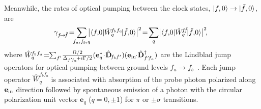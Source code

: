 \documentclass[aps,pra,twocolumn]{revtex4-1} %
\begin{document}
\begin{appendix}
Meanwhile, the rates of optical pumping between the clock states, $\lvert{f,0}\rangle \rightarrow \lvert{\tilde{f},0}\rangle$, are
	\begin{equation}\label{Eq::gammaff}
		\!\!\gamma_{f \!\rightarrow\! \tilde{f} }\! =\!\!\!\sum_{f_a,f_b,q}\!\!\!\big| \bra{f,\!0} \hat{W}_q^{\!f_bf_a} \!\ket{\tilde{f},\!0} \big|^2\!=\!\sum_{q}\!\big| \bra{f,\!0} \hat{W}_q^{\!f\!\tilde{f}} \!\ket{\tilde{f},\!0} \big|^2\!,
	\end{equation}
where $ \hat{W}_q^{\!f_bf_a} \!=\!\! \sum_{f'}\!\frac{\Omega/2}{\Delta_{f'\!f_a}\!+i\Gamma/2}(\mathbf{e}_q^*\!\cdot\!\hat{\mathbf{D}}_{\!f_bf'} )(\mathbf{e}_{\rm in}\!\!\cdot\! \hat{\mathbf{D}}^\dagger_{f'\!f_a} ) $ are the Lindblad jump operators for optical pumping between ground levels $ f_a\rightarrow f_b $~\cite{deutsch_quantum_2010}. 
Each jump operator $\hat{W}_q^{f_bf_a}$ is associated with absorption of the probe photon polarized along $ \mathbf{e}_{\rm in} $ direction followed by spontaneous emission of a photon with the circular polarization unit vector $ \mathbf{e}_q $ ($q=0,\pm 1$) for $\pi$ or $\pm \sigma$ transitions.  


\end{appendix}
\end{document}
